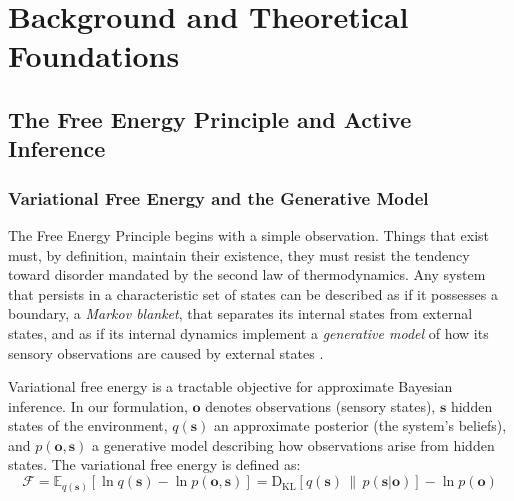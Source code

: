 \documentclass[11pt,a4paper]{article}
\theoremstyle{definition}
\newcommand{\E}{\mathbb{E}}
\newcommand{\KL}{\mathrm{D}_{\mathrm{KL}}}
\newcommand{\bq}{q}
\newcommand{\bp}{p}
\newcommand{\bo}{\bm{o}}
\newcommand{\bs}{\bm{s}}
\begin{document}


\section{Background and Theoretical Foundations}
\label{sec:background}

\subsection{The Free Energy Principle and Active Inference}
\label{sec:fep}

\subsubsection{Variational Free Energy and the Generative Model}
\label{sec:vfe}

The Free Energy Principle begins with a simple observation. Things that exist must, by definition, maintain their existence, they must resist the tendency toward disorder mandated by the second law of thermodynamics. Any system that persists in a characteristic set of states can be described as if it possesses a boundary, a \emph{Markov blanket}, that separates its internal states from external states, and as if its internal dynamics implement a \emph{generative model} of how its sensory observations are caused by external states \citep{friston2019particular}.

Variational free energy is a tractable objective for approximate Bayesian inference. In our formulation, $\bo$ denotes observations (sensory states), $\bs$ hidden states of the environment, $\bq(\bs)$ an approximate posterior (the system's beliefs), and $\bp(\bo, \bs)$ a generative model describing how observations arise from hidden states. The variational free energy is defined as:
\begin{equation}
\label{eq:vfe}
\mathcal{F} = \E_{\bq(\bs)}\!\left[\ln \bq(\bs) - \ln \bp(\bo, \bs)\right]
= \KL\!\left[\bq(\bs) \,\|\, \bp(\bs|\bo)\right] - \ln \bp(\bo)
\end{equation}
\end{document}
